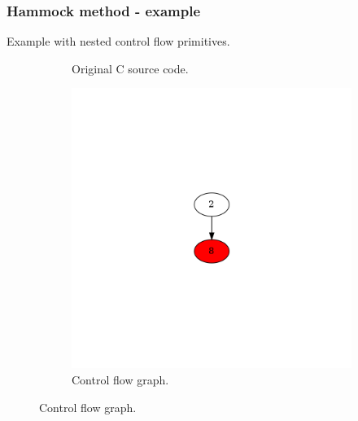 \documentclass[aspectratio=1610]{beamer}
\begin{document}
\begin{frame}[noframenumbering]
	\frametitle{Hammock method - example}
	Example with nested control flow primitives.
	\begin{figure}[htbp]
		\centering
		\begin{subfigure}[b]{0.30\textwidth}
			\centering
			
			\caption{Original C source code.}
		\end{subfigure}
		\begin{subfigure}[b]{0.50\textwidth}
			\centering
			\includegraphics[height=0.6\paperheight]{inc/methods/hammock/example/without-break/main_0003b.png}
			\caption{Control flow graph.}
		\end{subfigure}
	\end{figure}
\end{frame}
\end{document}
